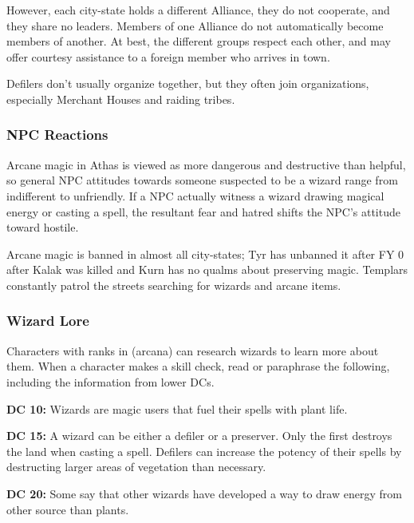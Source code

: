 However, each city-state holds a different Alliance, they do not cooperate, and they share no leaders. Members of one Alliance do not automatically become members of another. At best, the different groups respect each other, and may offer courtesy assistance to a foreign member who arrives in town.

Defilers don't usually organize together, but they often join organizations, especially Merchant Houses and raiding tribes.

\subsubsection{NPC Reactions}
Arcane magic in Athas is viewed as more dangerous and destructive than helpful, so general NPC attitudes towards someone suspected to be a wizard range from indifferent to unfriendly. If a NPC actually witness a wizard drawing magical energy or casting a spell, the resultant fear and hatred shifts the NPC's attitude toward hostile.

Arcane magic is banned in almost all city-states; Tyr has unbanned it after FY 0 after Kalak was killed and Kurn has no qualms about preserving magic. Templars constantly patrol the streets searching for wizards and arcane items.

\subsubsection{Wizard Lore}

Characters with ranks in  (arcana) can research wizards to learn more about them. When a character makes a skill check, read or paraphrase the following, including the information from lower DCs.

\textbf{DC 10:} Wizards are magic users that fuel their spells with plant life.

\textbf{DC 15:} A wizard can be either a defiler or a preserver. Only the first destroys the land when casting a spell. Defilers can increase the potency of their spells by destructing larger areas of vegetation than necessary.

\textbf{DC 20:} Some say that other wizards have developed a way to draw energy from other source than plants.